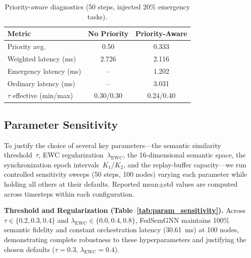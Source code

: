 \documentclass[conference]{IEEEtran}
\begin{document}
	\begin{table}[t]
	\centering
	\caption{Priority-aware diagnostics (50 steps, injected 20\% emergency tasks).}
	\label{tab:priority_study}
	\small
	\begin{tabular}{lcc}
	\toprule
	\textbf{Metric} & \textbf{No Priority} & \textbf{Priority-Aware} \\
	\midrule
	Priority avg. & 0.50 & 0.333 \\
	Weighted latency (ms) & 2.726 & 2.116 \\
	Emergency latency (ms) & -- & 1.202 \\
	Ordinary latency (ms) & -- & 3.031 \\
	$\tau$ effective (min/max) & 0.30/0.30 & 0.24/0.40 \\
	\bottomrule
	\end{tabular}
	\end{table}
	
	\subsection{Parameter Sensitivity}
	\textcolor{revblue}{To justify the choice of several key parameters---the semantic similarity threshold~$\tau$, EWC regularization~$\lambda_{\mathrm{EWC}}$, the 16-dimensional semantic space, the synchronization epoch intervals~$K_1$/$K_2$, and the replay-buffer capacity---we run controlled sensitivity sweeps (50 steps, 100 nodes) varying each parameter while holding all others at their defaults. Reported mean$\pm$std values are computed across timesteps within each configuration.}

	\textcolor{revblue}{\textbf{Threshold and Regularization (Table~\ref{tab:param_sensitivity}).}}
	\textcolor{revblue}{Across $\tau \in \{0.2, 0.3, 0.4\}$ and $\lambda_{\mathrm{EWC}} \in \{0.0, 0.4, 0.8\}$, FedSemGNN maintains 100\% semantic fidelity and constant orchestration latency (30.61~ms) at 100 nodes, demonstrating complete robustness to these hyperparameters and justifying the chosen defaults ($\tau{=}0.3$, $\lambda_{\mathrm{EWC}}{=}0.4$).}
\end{document}
